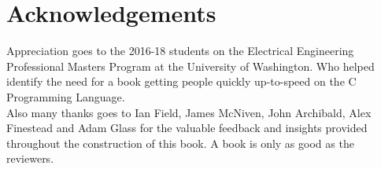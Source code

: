\section*{Acknowledgements}

Appreciation goes to the 2016-18 students on the Electrical Engineering Professional Masters Program at the University of Washington. Who helped identify the need for a book getting people quickly up-to-speed on the C Programming Language.\\

Also many thanks goes to Ian Field, James McNiven, John Archibald, Alex Finestead and Adam Glass for the valuable feedback and insights provided throughout the construction of this book. A book is only as good as the reviewers.

